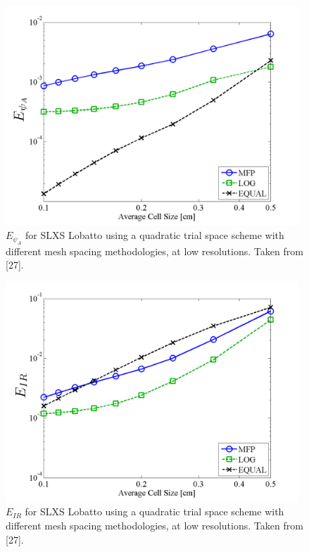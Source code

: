 %
\begin{figure}[!htp]
\centering
\includegraphics[width=11cm]{chapter3_variable_xs/LOW_RES_P2_LOBATTO_E_PSI_A.png}
\caption{$E_{\psi_A}$ for SLXS Lobatto using a quadratic trial space scheme with different mesh spacing methodologies, at low resolutions.  Taken from [27].}
\label{fig:low_res_lobatto_psi_A}
\end{figure}
%
%
\begin{figure}[!hbp]
\centering
\includegraphics[width=11cm]{chapter3_variable_xs/LOW_RES_P2_LOBATTO_E_IR.png}
\caption{$E_{IR}$ for SLXS Lobatto using a quadratic trial space scheme with different mesh spacing methodologies, at low resolutions.  Taken from [27].}
\label{fig:low_res_lobatto_ir}
\end{figure}


